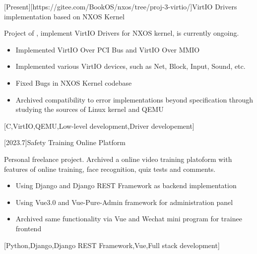 \documentclass{resume}
\begin{document}
\begin {projects}
	[Present][https://gitee.com/BookOS/nxos/tree/proj-3-virtio/]{VirtIO Drivers implementation based on NXOS Kernel}{
		Project of , implement VirtIO Drivers for NXOS kernel, is currently ongoing.
		\begin{itemize}
			\item Implemented VirtIO Over PCI Bus and VirtIO Over MMIO
			\item Implemented various VirtIO devices, such as Net, Block, Input, Sound, etc.
			\item Fixed Bugs in NXOS Kernel codebase
			\item Archived compatibility to error implementations beyond specification through studying the sources of Linux kernel and QEMU
		\end{itemize}
	}[C,VirtIO,QEMU,Low-level development,Driver developement]

	[2023.7]{Safety Training Online Platform}{
		Personal freelance project. Archived a online video training platoform with features of online training, face recognition, quiz tests and comments.
		\begin{itemize}
			\item Using Django and Django REST Framework as backend implementation
			\item Using Vue3.0 and Vue-Pure-Admin framework for administration panel
			\item Archived same functionality via Vue and Wechat mini program for trainee frontend
		\end{itemize}
	}[Python,Django,Django REST Framework,Vue,Full stack development]


\end{projects}
\end{document}

